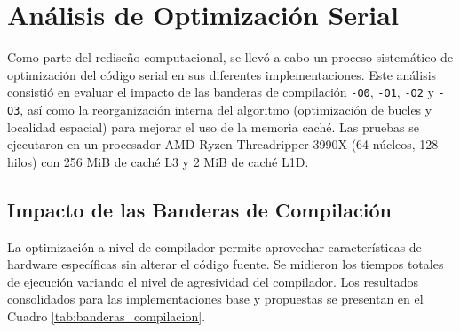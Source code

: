 \documentclass[12pt, a4paper]{article}
\begin{document}
\section{Análisis de Optimización Serial}
\label{sec:opt_serial}

Como parte del rediseño computacional, se llevó a cabo un proceso sistemático de optimización del código serial en sus diferentes implementaciones. Este análisis consistió en evaluar el impacto de las banderas de compilación \texttt{-O0}, \texttt{-O1}, \texttt{-O2} y \texttt{-O3}, así como la reorganización interna del algoritmo (optimización de bucles y localidad espacial) para mejorar el uso de la memoria caché. Las pruebas se ejecutaron en un procesador AMD Ryzen Threadripper 3990X (64 núcleos, 128 hilos) con 256 MiB de caché L3 y 2 MiB de caché L1D.

\subsection{Impacto de las Banderas de Compilación}

La optimización a nivel de compilador permite aprovechar características de hardware específicas sin alterar el código fuente. Se midieron los tiempos totales de ejecución variando el nivel de agresividad del compilador. Los resultados consolidados para las implementaciones base y propuestas se presentan en el Cuadro \ref{tab:banderas_compilacion}.

\begin{table}[h]
\centering
\caption{Tiempo de ejecución promedio (en segundos) según bandera de compilación y versión del código para los cuatro métodos numéricos.}
\label{tab:banderas_compilacion}
\end{table}
\end{document}

